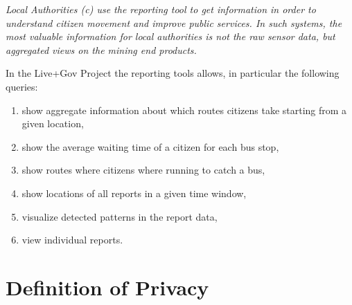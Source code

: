 \documentclass[runningheads,a4paper]{llncs}
\newenvironment{LGContent}
{ \par\color{blue} \it \small }
{ \par }
\begin{document}
\begin{LGContent}
\textit{Local Authorities} (c) use the reporting tool to get information in order to understand citizen movement and improve public services.
In such systems, the most valuable information for local authorities is not the raw sensor data, but aggregated views on the mining end products.

In the Live+Gov Project the reporting tools allows, in particular the following queries:
\begin{enumerate}
\item show aggregate information about which routes citizens take starting from a given location,
\item show the average waiting time of a citizen for each bus stop,
\item show routes where citizens where running to catch a bus,
\item show locations of all reports in a given time window,
\item visualize detected patterns in the report data,
\item view individual reports.
\end{enumerate}
\end{LGContent}



\section{Definition of Privacy}
\label{sec:privacydef}
\end{document}
